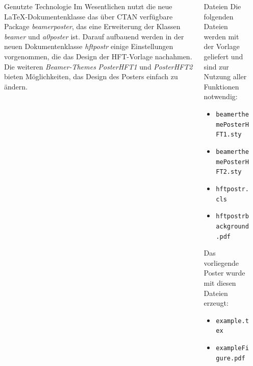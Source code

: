\documentclass[
  scale = 1.5,
  advisor = {{https://github.com/nachos-con-queso/HFT-Poster}},
  authorLabel = {{(jens@calov.net)}},
  advisorLabel = {{(Download-URL)}},
]{hftpostr}
\begin{document}
\begin{frame}[fragile, t]
  \begin{columns}[onlytextwidth, T]
      \begin{column}{.31\textwidth}
        \begin{block}{Genutzte Technologie}
          Im Wesentlichen nutzt die neue \LaTeX-Dokumentenklasse das über CTAN verfügbare Package \textit{beamerposter}, das eine Erweiterung der Klassen \textit{beamer} und \textit{a0poster} ist.
          Darauf aufbauend werden in der neuen Dokumentenklasse \textit{hftpostr} einige Einstellungen vorgenommen, die das Design der HFT-Vorlage nachahmen.
          Die weiteren \textit{Beamer-Themes} \textit{PosterHFT1} und \textit{PosterHFT2} bieten Möglichkeiten, das Design des Posters einfach zu ändern.
        \end{block}
      \end{column}
      \begin{column}{.31\textwidth}
        \begin{block}{Dateien}
          Die folgenden Dateien werden mit der Vorlage geliefert und sind zur Nutzung aller Funktionen notwendig:
          \begin{itemize}
            \item \texttt{beamerthemePosterHFT1.sty}
            \item \texttt{beamerthemePosterHFT2.sty}
            \item \texttt{hftpostr.cls}
            \item \texttt{hftpostrbackground.pdf}
          \end{itemize}
          Das vorliegende Poster wurde mit diesen Dateien erzeugt:
          \begin{itemize}
            \item \texttt{example.tex}
            \item \texttt{exampleFigure.pdf}
          \end{itemize}
        \end{block}
      \end{column}
      \begin{column}{.31\textwidth}
      \end{column}
  \end{columns}


\end{frame}
\end{document}

